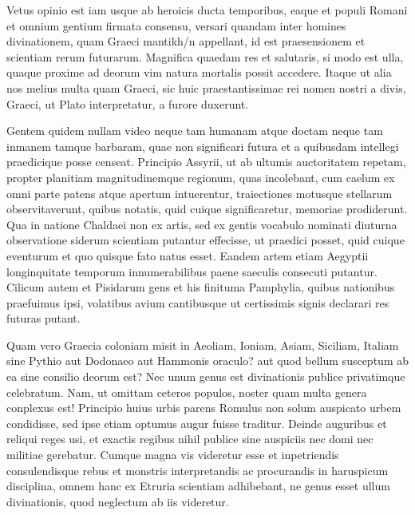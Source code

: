 
 Vetus opinio est iam usque ab heroicis ducta temporibus, eaque et populi Romani et omnium gentium firmata consensu, versari quandam inter homines divinationem, quam Graeci mantikh/n appellant, id est praesensionem et scientiam rerum futurarum. Magnifica quaedam res et salutaris, si modo est ulla, quaque proxime ad deorum vim natura mortalis possit accedere. Itaque ut alia nos melius multa quam Graeci, sic huic praestantissimae rei nomen nostri a divis, Graeci, ut Plato interpretatur, a furore duxerunt.

 Gentem quidem nullam video neque tam humanam atque doctam neque tam inmanem tamque barbaram, quae non significari futura et a quibusdam intellegi praedicique posse censeat. Principio Assyrii, ut ab ultumis auctoritatem repetam, propter planitiam magnitudinemque regionum, quas incolebant, cum caelum ex omni parte patens atque apertum intuerentur, traiectiones motusque stellarum observitaverunt, quibus notatis, quid cuique significaretur, memoriae prodiderunt. Qua in natione Chaldaei non ex artis, sed ex gentis vocabulo nominati diuturna observatione siderum scientiam putantur effecisse, ut praedici posset, quid cuique eventurum et quo quisque fato natus esset. Eandem artem etiam Aegyptii longinquitate temporum innumerabilibus paene saeculis consecuti putantur. Cilicum autem et Pisidarum gens et his finituma Pamphylia, quibus nationibus praefuimus ipsi, volatibus avium cantibusque ut certissimis signis declarari res futuras putant.

 Quam vero Graecia coloniam misit in Aeoliam, Ioniam, Asiam, Siciliam, Italiam sine Pythio aut Dodonaeo aut Hammonis oraculo? aut quod bellum susceptum ab ea sine consilio deorum est? Nec unum genus est divinationis publice privatimque celebratum. Nam, ut omittam ceteros populos, noster quam multa genera conplexus est! Principio huius urbis parens Romulus non solum auspicato urbem condidisse, sed ipse etiam optumus augur fuisse traditur. Deinde auguribus et reliqui reges usi, et exactis regibus nihil publice sine auspiciis nec domi nec militiae gerebatur. Cumque magna vis videretur esse et inpetriendis consulendisque rebus et monstris interpretandis ac procurandis in haruspicum disciplina, omnem hanc ex Etruria scientiam adhibebant, ne genus esset ullum divinationis, quod neglectum ab iis videretur.

